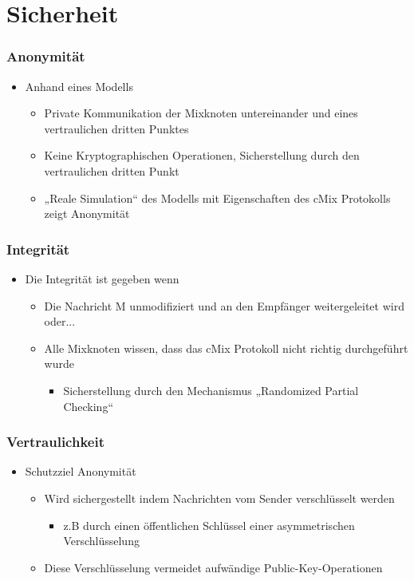 \documentclass[t, xcolor=dvipsnames]{beamer}
\begin{document}
\section{Sicherheit}

\begin{frame}
	\frametitle{Anonymität}
	\begin{itemize}
		\item Anhand eines Modells
			\begin{itemize}
				\item Private Kommunikation der Mixknoten untereinander und eines vertraulichen dritten Punktes
				\item Keine Kryptographischen Operationen, Sicherstellung durch den vertraulichen dritten Punkt
				\item „Reale Simulation“ des Modells mit Eigenschaften des cMix Protokolls zeigt Anonymität
			\end{itemize}
	\end{itemize}
	\vspace{\fill}
\end{frame}

\begin{frame}
	\frametitle{Integrität}
	\begin{itemize}
		\item Die Integrität ist gegeben wenn
			\begin{itemize}
				\item Die Nachricht M unmodifiziert und an den Empfänger weitergeleitet wird oder...
				\item Alle Mixknoten wissen, dass das cMix Protokoll nicht richtig durchgeführt wurde
					\begin{itemize}
						\item Sicherstellung durch den Mechanismus „Randomized Partial Checking“
					\end{itemize}
			\end{itemize}
	\end{itemize}
	\vspace{\fill}
\end{frame}

\begin{frame}
	\frametitle{Vertraulichkeit}
	\begin{itemize}
		\item Schutzziel Anonymität
			\begin{itemize}
				\item Wird sichergestellt indem Nachrichten vom Sender verschlüsselt werden
					\begin{itemize}
						\item z.B durch einen öffentlichen Schlüssel einer asymmetrischen Verschlüsselung
					\end{itemize}
				\item Diese Verschlüsselung vermeidet aufwändige Public-Key-Operationen 
			\end{itemize}
	\end{itemize}
	\vspace{\fill}
\end{frame}
\end{document}
